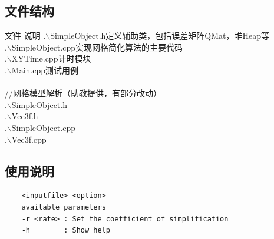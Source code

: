 \documentclass{article}
\begin{document}
\subsection{文件结构}
\begin{tabbing}
\hspace*{2em}\=文件\hspace*{8em} \=说明\hspace*{20em}\kill
\>.$\backslash$SimpleObject.h\>定义辅助类，包括误差矩阵QMat，堆Heap等\\
\>.$\backslash$SimpleObject.cpp\>实现网格简化算法的主要代码\\
\>.$\backslash$XYTime.cpp\>计时模块\\
\>.$\backslash$Main.cpp\>测试用例\\\\
\>//网格模型解析（助教提供，有部分改动）\\
\>.$\backslash$SimpleObject.h\>\\
\>.$\backslash$Vec3f.h\>\\
\>.$\backslash$SimpleObject.cpp\>\\
\>.$\backslash$Vec3f.cpp\>
\end{tabbing}
\subsection{使用说明}
\begin{verbatim}
    <inputfile> <option>
    available parameters
    -r <rate> : Set the coefficient of simplification
    -h        : Show help
\end{verbatim}
\end{document}
